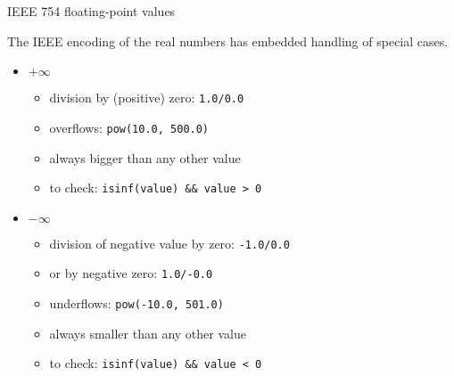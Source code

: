 \documentclass[aspectratio=169,14pt]{beamer}
\begin{document}
\begin{frame}{IEEE 754 floating-point values}

The IEEE encoding of the real numbers has embedded handling of special cases.

\begin{itemize}
    \item \( + \infty \)
    \begin{itemize}
        \item division by (positive) zero: \texttt{1.0/0.0}
        \item overflows: \texttt{pow(10.0, 500.0)}
        \item always bigger than any other value
        \item to check: \texttt{isinf(value) \&\& value > 0}
    \end{itemize}

    \item \( - \infty \)
    \begin{itemize}
        \item division of negative value by zero: \texttt{-1.0/0.0}
        \item or by negative zero: \texttt{1.0/-0.0}
        \item underflows: \texttt{pow(-10.0, 501.0)}
        \item always smaller than any other value
        \item to check: \texttt{isinf(value) \&\& value < 0}
    \end{itemize}
\end{itemize}
\end{frame}
\end{document}
